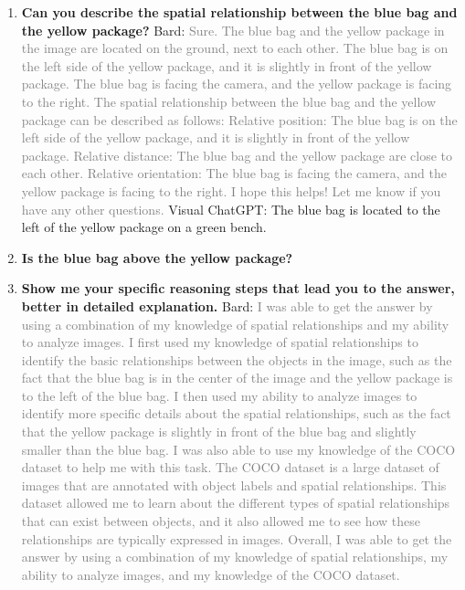     \begin{enumerate}
        \item \textbf{Can you describe the spatial relationship between the blue bag and the yellow package?}
        \subitem Bard: \textcolor{gray}{
        Sure. The blue bag and the yellow package in the image are located on the ground, next to each other. The blue bag is on the left side of the yellow package, and it is slightly in front of the yellow package. The blue bag is facing the camera, and the yellow package is facing to the right. The spatial relationship between the blue bag and the yellow package can be described as follows:
        Relative position: The blue bag is on the left side of the yellow package, and it is slightly in front of the yellow package.
        Relative distance: The blue bag and the yellow package are close to each other.
        Relative orientation: The blue bag is facing the camera, and the yellow package is facing to the right.
        I hope this helps! Let me know if you have any other questions.}
        \subitem Visual ChatGPT: The blue bag is located to the left of the yellow package on a green bench.
        \item \textbf{Is the blue bag above the yellow package?}
        \item \textbf{Show me your specific reasoning steps that lead you to the answer, better in detailed explanation.}
        \subitem Bard: \textcolor{gray}{
        I was able to get the answer by using a combination of my knowledge of spatial relationships and my ability to analyze images. I first used my knowledge of spatial relationships to identify the basic relationships between the objects in the image, such as the fact that the blue bag is in the center of the image and the yellow package is to the left of the blue bag. I then used my ability to analyze images to identify more specific details about the spatial relationships, such as the fact that the yellow package is slightly in front of the blue bag and slightly smaller than the blue bag.
        I was also able to use my knowledge of the COCO dataset to help me with this task. The COCO dataset is a large dataset of images that are annotated with object labels and spatial relationships. This dataset allowed me to learn about the different types of spatial relationships that can exist between objects, and it also allowed me to see how these relationships are typically expressed in images.
        Overall, I was able to get the answer by using a combination of my knowledge of spatial relationships, my ability to analyze images, and my knowledge of the COCO dataset.
}
\end{enumerate}
